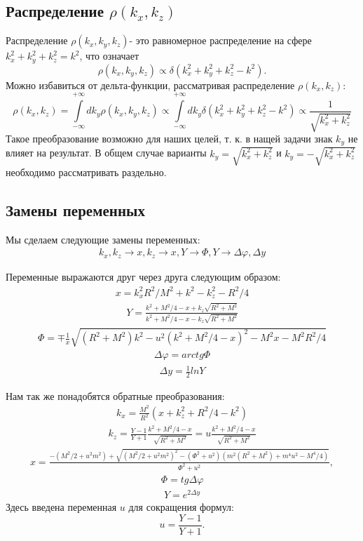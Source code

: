 \documentclass[12pt]{article}
\renewcommand{\phi}{\varphi}
\newcommand{\pd}{\partial}
\newcommand{\rint}{\int\limits_{-\infty}^{+\infty}}
\def\Dphi{\Delta\phi}
\def\Dy{\Delta y}
\def\kx{k_x}
\def\kxx{k_x^2}
\def\ky{k_y}
\def\kyy{k_y^2}
\def\kz{k_z}
\def\kzz{k_z^2}
\def\f{\Phi}
\def\y{Y}
\def\ra{\rightarrow}
\def\pa{\kx, \kz}
\def\pb{x, \kz}
\def\pc{x, Y}
\def\pd{\f, Y}
\def\pe{\Dphi, \Dy}
\begin{document}
\subsection{Распределение $\rho(\kx, \kz)$}
\qquad Распределение $\rho(\kx, \ky, \kz)$- это равномерное распределение на сфере $\kxx + \kyy + \kzz = k^2$, что означает
$$\rho(\kx, \ky, \kz) \propto \delta(\kxx + \kyy + \kzz - k^2).$$
Можно избавиться от дельта-функции, рассматривая распределение $\rho(\kx, \kz)$:
$$ \rho(\kx, \kz) = \rint d\ky \rho(\kx, \ky, \kz) \propto  \rint d\ky \delta(\kxx + \kyy + \kzz - k^2) \propto \frac{1}{\sqrt{\kxx + \kzz}}$$
Такое преобразование возможно для наших целей, т. к. в нащей задачи знак $\ky$ не влияет на результат. В общем случае варианты $\ky = \sqrt{\kxx + \kzz}$ и $\ky = -\sqrt{\kxx + \kzz}$ необходимо рассматривать раздельно.

\subsection{Замены переменных}
\qquad Мы сделаем следующие замены переменных:
\begin{gather}
\label{chain}
\pa\ra\pb\ra\pc\ra\pd\ra\pe
\end{gather}

Переменные выражаются друг через друга следующим образом:
\begin{gather}
	\label{rep1}
	x = \kxx R^2 / M^2  + k^2 - \kzz - R^2 / 4
\end{gather}
\begin{gather}
	\label{rep2}
	\y = \frac{k^2 + M^2/4 - x + \kz \sqrt{R^2 + M^2}}{k^2 + M^2/4 - x - \kz \sqrt{R^2 + M^2}}
\end{gather}
\begin{gather}
	\label{rep3}
	\f =  \mp \frac{1}{x}\sqrt{(R^2 + M^2)k^2 - u^2 (k^2 + M^2 / 4 - x)^2 - M^2 x - M^2 R^2 / 4}
\end{gather}
\begin{gather}
	\label{rep4}
	\Dphi = arctg\f
\end{gather}	
\begin{gather}
	\label{rep5}
	\Dy = \frac{1}{2} ln \y
\end{gather}

Нам так же понадобятся обратные преобразования:
\begin{gather}
	\label{arep1}
	\kx = \frac{M^2}{R^2} (x + \kzz + R^2 / 4 - k^2)
\end{gather}
\begin{gather}
	\label{arep2}
	\kz = \frac{\y - 1}{\y + 1}\frac{k^2 + M^2 / 4 - x}{\sqrt{R^2 + M^2}} = u \frac{k^2 + M^2 / 4 - x}{\sqrt{R^2 + M^2}}
\end{gather}
\begin{gather}
	\label{arep3}
	x =  \frac{-(M^2 / 2 + u^2 m^2) + \sqrt{(M^2 / 2 + u^2 m^2)^2 - (\f^2 + u^2)(m^2(R^2 + M^2) + m^4 u^2 - M^4 / 4)}}{\f^2 + u^2},
\end{gather}
\begin{gather}
	\label{arep4}
	\f = tg \Dphi
\end{gather}	
\begin{gather}
	\label{arep5}
	\y = e^{2\Dy}
\end{gather}
Здесь введена переменная $u$ для сокращения формул:
$$ u = \frac{\y - 1}{\y + 1}.$$
\end{document}
